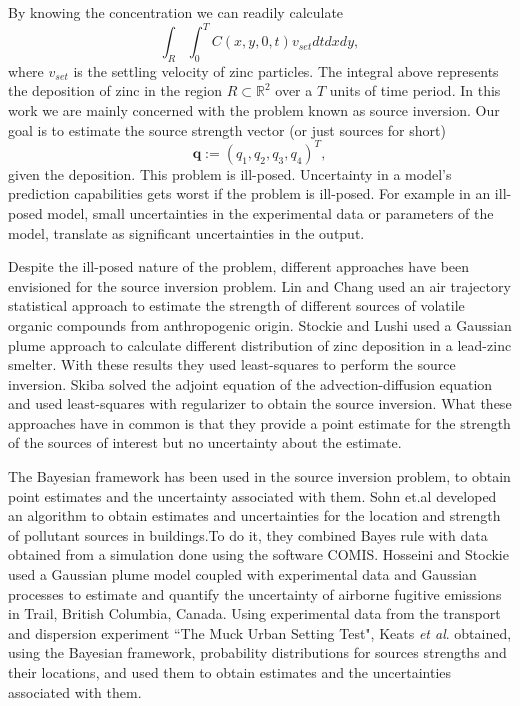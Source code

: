 \documentclass[12pt]{book}
\newcommand{\q}{\textbf{q}}
\begin{document}
 By knowing the concentration we can readily calculate
\begin{equation*}
\int_{R}\int_{0}^{T} C(x,y,0,t)v_{set}dtdxdy,
\end{equation*}
where $v_{set}$ is the settling velocity of zinc particles. 
The integral above represents the deposition of zinc in the region 
$R\subset\mathbb{R}^{2}$ over a $T$ units of time period.
In this work we are mainly concerned with the problem known as source inversion.
Our goal is to estimate the source strength vector (or just sources for short)
\begin{equation*}
\q:=(q_{1},q_{2},q_{3},q_{4})^{T},
\end{equation*}
given the deposition.
This problem is ill-posed\cite{enting1990inverse}.
Uncertainty in a model's prediction capabilities gets worst if the problem
is ill-posed. For example in an ill-posed model, small uncertainties
in the experimental data or parameters of the model, translate
as significant uncertainties in the output.

Despite the ill-posed nature of the problem, different
approaches have been envisioned for the source inversion
problem. Lin and Chang \cite{lin2002relative} used an air
trajectory statistical approach to estimate
the strength of different sources of volatile organic compounds
from anthropogenic origin. Stockie and Lushi \cite{lushi2010inverse} 
used a Gaussian plume approach to calculate different distribution
of zinc deposition in a lead-zinc smelter. With these results
they used  least-squares to perform the source inversion.
Skiba \cite{skiba2003method}  solved the adjoint equation
of the advection-diffusion equation and used least-squares 
with regularizer to obtain the source inversion. What
these approaches have in common is that they provide a point
estimate for the strength of the sources of interest but
no uncertainty about the estimate.

The Bayesian  framework has been used in the source inversion
problem, to obtain point estimates and the uncertainty associated 
with them. Sohn et.al \cite{sohn2002rapidly} developed an 
algorithm to obtain estimates and uncertainties for
the location and strength of pollutant sources in buildings.To do it,
they combined Bayes rule with data obtained from a simulation 
done using the software COMIS. Hosseini and Stockie \cite{hosseini2016bayesian}
used a Gaussian plume model coupled with 
experimental data and  Gaussian processes to estimate
and quantify the uncertainty of airborne fugitive
emissions in Trail, British Columbia, Canada. Using
experimental data from the transport and dispersion 
experiment ``The Muck Urban Setting Test", Keats \textit{et al}. \cite{keats2007bayesian}
obtained, using the Bayesian framework, probability distributions for sources strengths
and their locations, and used them to obtain estimates and the uncertainties associated with them.
\end{document}

